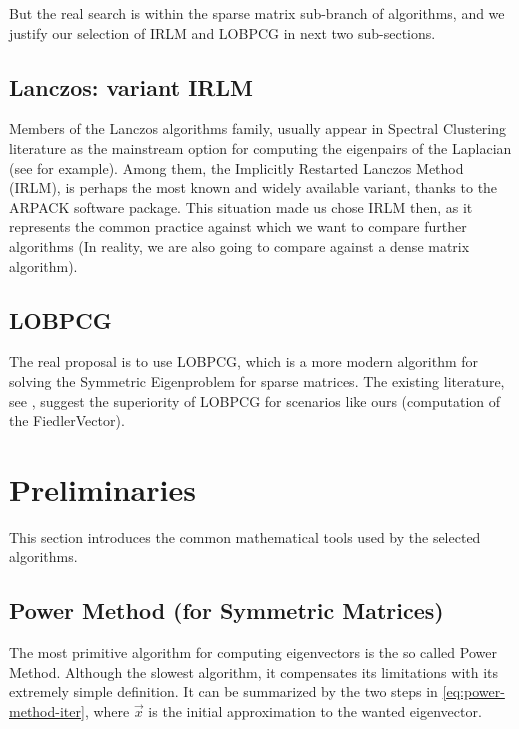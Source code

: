 But the real search is within the sparse matrix sub-branch of
algorithms, and we justify our selection of \gls{IRLM} and
\gls{LOBPCG} in next two sub-sections.

\subsection{Lanczos: variant \gls{IRLM}}

Members of the Lanczos algorithms family, 
usually appear in Spectral Clustering literature as the mainstream
option for computing the eigenpairs of the
\gls{Laplacian} (see \cite{luxburg07} for example). Among them,
the Implicitly Restarted Lanczos Method (\gls{IRLM}), is perhaps
the most known and widely available variant, thanks to the
ARPACK \cite{arpack} software package. This situation made us chose
\gls{IRLM} then, as it represents the common practice
against which we want to compare further algorithms (In reality, we are
also going to compare against a dense matrix algorithm).

\subsection{\gls{LOBPCG}}

The real proposal is to use \gls{LOBPCG}, which is a more modern
algorithm for solving the Symmetric Eigenproblem for sparse
matrices. The existing literature, see \cite{knyazev03}, suggest the
superiority of LOBPCG for scenarios like ours (computation of the
\gls{FiedlerVector}). 

\section{Preliminaries}

This section introduces the common mathematical tools used by the
selected algorithms.

\subsection{Power Method (for Symmetric Matrices)}

The most primitive algorithm for computing eigenvectors is the so
called Power Method. Although the slowest algorithm, it compensates
its limitations with its extremely simple definition. It can be
summarized by the two steps in \cref{eq:power-method-iter}, where
$\vec{x}$ is the initial approximation to the wanted eigenvector.

